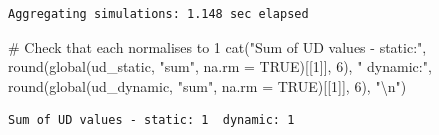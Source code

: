 \documentclass[
  letterpaper,
  DIV=11,
  numbers=noendperiod]{scrartcl}
\newenvironment{Shaded}{\begin{snugshade}}{\end{snugshade}}
\newcommand{\AttributeTok}[1]{\textcolor[rgb]{0.40,0.45,0.13}{#1}}
\newcommand{\CommentTok}[1]{\textcolor[rgb]{0.37,0.37,0.37}{#1}}
\newcommand{\ConstantTok}[1]{\textcolor[rgb]{0.56,0.35,0.01}{#1}}
\newcommand{\DecValTok}[1]{\textcolor[rgb]{0.68,0.00,0.00}{#1}}
\newcommand{\FunctionTok}[1]{\textcolor[rgb]{0.28,0.35,0.67}{#1}}
\newcommand{\NormalTok}[1]{\textcolor[rgb]{0.00,0.23,0.31}{#1}}
\newcommand{\SpecialCharTok}[1]{\textcolor[rgb]{0.37,0.37,0.37}{#1}}
\newcommand{\StringTok}[1]{\textcolor[rgb]{0.13,0.47,0.30}{#1}}
\begin{document}
\begin{verbatim}
Aggregating simulations: 1.148 sec elapsed
\end{verbatim}

\begin{Shaded}
\begin{Highlighting}[]
\CommentTok{\# Check that each normalises to 1}
\FunctionTok{cat}\NormalTok{(}\StringTok{"Sum of UD values {-} static:"}\NormalTok{,}
    \FunctionTok{round}\NormalTok{(}\FunctionTok{global}\NormalTok{(ud\_static, }\StringTok{"sum"}\NormalTok{, }\AttributeTok{na.rm =} \ConstantTok{TRUE}\NormalTok{)[[}\DecValTok{1}\NormalTok{]], }\DecValTok{6}\NormalTok{),}
    \StringTok{" dynamic:"}\NormalTok{,}
    \FunctionTok{round}\NormalTok{(}\FunctionTok{global}\NormalTok{(ud\_dynamic, }\StringTok{"sum"}\NormalTok{, }\AttributeTok{na.rm =} \ConstantTok{TRUE}\NormalTok{)[[}\DecValTok{1}\NormalTok{]], }\DecValTok{6}\NormalTok{), }\StringTok{"}\SpecialCharTok{\textbackslash{}n}\StringTok{"}\NormalTok{)}
\end{Highlighting}
\end{Shaded}

\begin{verbatim}
Sum of UD values - static: 1  dynamic: 1 
\end{verbatim}
\end{document}
